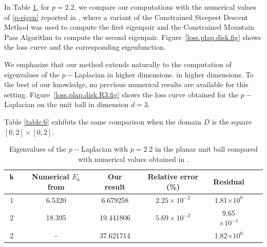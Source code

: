\documentclass[reprint,superscriptaddress,aps,prl]{revtex4-2}
\begin{document}
 
In Table \ref{table.5}, for $p=2.2$, we compare our computations with the numerical values of \eqref{p-eigen} reported in \cite{HJ11}, where a variant of the Constrained Steepest Descent Method was used to compute the first eigenpair and the Constrained Mountain Pass Algorithm to compute the second eigenpair.  Figure~\ref{loss.plap.disk.fig} shows the loss curve and the corresponding eigenfunction.

We emphasize that our method extends naturally to the computation of eigenvalues of the $p-$Laplacian in higher dimensions. in higher dimensions. To the best of our knowledge, no previous numerical results are available for this setting. Figure~\ref{loss.plap.disk.R3.fig} shows the loss curve obtained for the $p-$Laplacian on the unit ball in dimension $d=3$.


Table \ref{table.6} exhibits the same comparison when the domain $D$ is the square $[0,2]\times [0,2]$.

\begin{table}[h!]
\centering
 
\begin{tabular}{c| c|c|c|c|c|c}
k \,& Numerical $E_{k}$ from \cite{HJ11} & Our result & Relative error (\%)&  Residual \\ 
\hline
1  & 6.5320    & 6.679258 & $2.25\times 10^{-2}$& 1.81$\times 10^0$ \\
2  & 18.395    & 19.441806 & $5.69\times 10^{-2}$&9.65$\times 10^{-1}$\\
2  & -    & 37.621714 & & 1.82$\times 10^0$
\end{tabular}
\caption{Eigenvalues of the $p-$Laplacian with $p=2.2$ in the planar unit ball  compared with numerical values obtained in \cite{HJ11}.}
\label{table.5}
 
\end{table}


%
%
%
%
\end{document}
